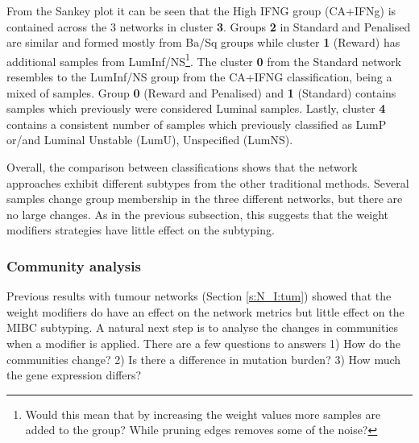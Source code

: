 From the Sankey plot it can be seen that the High IFNG group (CA+IFNg) is contained across the 3 networks in cluster \textbf{3}. Groups \textbf{2} in Standard and Penalised are similar and formed mostly from Ba/Sq groups while cluster \textbf{1} (Reward) has additional samples from LumInf/NS\footnote{Would this mean that by increasing the weight values more samples are added to the group? While pruning edges removes some of the noise?}. The cluster \textbf{0} from the Standard network resembles to the LumInf/NS group from the CA+IFNG classification, being a mixed of samples. Group \textbf{ 0} (Reward and Penalised) and \textbf{1} (Standard) contains samples which previously were considered Luminal samples. Lastly, cluster \textbf{4} contains a consistent number of samples which previously classified as LumP or/and Luminal Unstable (LumU), Unspecified (LumNS).

Overall, the comparison between classifications shows that the network approaches exhibit different subtypes from the other traditional methods. Several samples change group membership in the three different networks, but there are no large changes. As in the previous subsection,  this suggests that the weight modifiers strategies have little effect on the subtyping.

\subsubsection{Community analysis}

Previous results with tumour networks (Section \ref{s:N_I:tum}) showed that the weight modifiers do have an effect on the network metrics but little effect on the MIBC subtyping. A natural next step is to analyse the changes in communities when a modifier is applied. There are a few questions to answers 1) How do the communities change? 2) Is there a difference in mutation burden? 3) How much the gene expression differs? 

